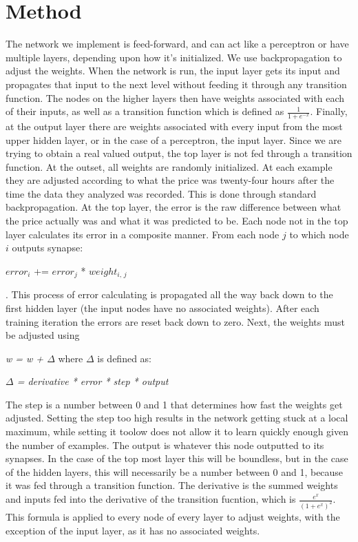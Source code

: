 \documentclass[a4paper,10pt]{article}
\begin{document}
\section{Method}
The network we implement is feed-forward, and can act like a perceptron or have multiple layers, depending
upon how it's initialized.  We use backpropagation to adjust the weights.  When the network is run, the input
layer gets its input and propagates that input to the next level without feeding it through any transition 
function.  The nodes on the higher layers then have weights associated with each of their inputs, as well as
a transition function which is defined as $\frac{1}{1 + e^{-x}}$.  Finally, at the output layer there are weights
associated with every input from the most upper hidden layer, or in the case of a perceptron, the input layer.  Since
we are trying to obtain a real valued output, the top layer is not fed through a transition function.  At the outset,
all weights are randomly initialized.  At each example they are adjusted according to what the price was twenty-four
hours after the time the data they analyzed was recorded.  This is done through standard backpropagation.  At the top
layer, the error is the raw difference between what the price actually was and what it was predicted to be.  Each node
not in the top layer calculates its error in a composite manner.  From each node $\textit{j}$ to which node $\textit{i}$ outputs
synapse:
\newline \newline \centerline{$error_{\textit{i}}$ += $error_{\textit{j}}$ * $weight_{\textit{i, j}}$}.  
\newline \newline This process of error
calculating is propagated all the way back down to the first hidden layer (the input nodes have no associated weights).
After each training iteration the errors are reset back down to zero.
Next, the weights must be adjusted using \newline \newline 
\centerline{\textit{w = w + $\Delta$} where $\Delta$ is defined as:} \newline \newline 
\centerline{\textit{$\Delta$ = derivative * error * step * output}}  
\newline \newline The step is a
number between 0 and 1 that determines how fast the weights get adjusted.  Setting the step too high results in the
network getting stuck at a local maximum, while setting it toolow does not allow it to learn quickly enough given the number
of examples.  The output is whatever this node outputted to its synapses.  In the case of the top most layer this will be 
boundless, but in the case of the hidden layers, this will necessarily be a number between 0 and 1, because it was fed through
a transition function.  The derivative is the summed weights and inputs fed into the derivative of the transition fucntion, which
is {$\frac{e^{x}}{({1 + e^{x}})^{2}}$}.
This formula is applied to every node of every layer to adjust weights, with the exception of the input
layer, as it has no associated weights.
\end{document}
